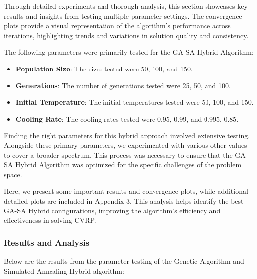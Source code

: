 \documentclass[
]{article}
\begin{document}
    Through detailed experiments and thorough analysis, this section showcases key results and insights from testing multiple parameter settings. The convergence plots provide a visual representation of the algorithm's performance across iterations, highlighting trends and variations in solution quality and consistency.


    The following parameters were primarily tested for the GA-SA Hybrid Algorithm:

    \begin{itemize}
        \item \textbf{Population Size}: The sizes tested were 50, 100, and 150.
        \item \textbf{Generations}: The number of generations tested were 25, 50, and 100.
        \item \textbf{Initial Temperature}: The initial temperatures tested were 50, 100, and 150.
        \item \textbf{Cooling Rate}: The cooling rates tested were 0.95, 0.99, and 0.995, 0.85.
    \end{itemize}

    Finding the right parameters for this hybrid approach involved extensive testing. Alongside these primary parameters, we experimented with various other values to cover a broader spectrum. This process was necessary to ensure that the GA-SA Hybrid Algorithm was optimized for the specific challenges of the problem space.

    Here, we present some important results and convergence plots, while additional detailed plots are included in Appendix 3. This analysis helps identify the best GA-SA Hybrid configurations, improving the algorithm's efficiency and effectiveness in solving CVRP.

    \subsubsection{Results and Analysis}
    Below are the results from the parameter testing of the Genetic Algorithm and Simulated Annealing Hybrid algorithm:
\end{document}
